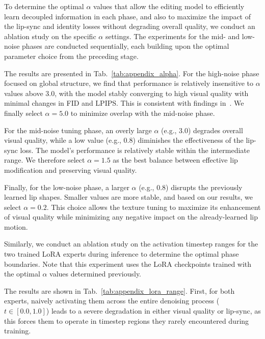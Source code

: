 To determine the optimal $\alpha$ values that allow the editing model to efficiently learn decoupled information in each phase, and also to maximize the impact of the lip-sync and identity losses without degrading overall quality, we conduct an ablation study on the specific $\alpha$ settings. The experiments for the mid- and low-noise phases are conducted sequentially, each building upon the optimal parameter choice from the preceding stage.



The results are presented in Tab.~\ref{tab:appendix_alpha}. For the high-noise phase focused on global structure, we find that performance is relatively insensitive to $\alpha$ values above 3.0, with the model stably converging to high visual quality with minimal changes in FID and LPIPS. This is consistent with findings in~\cite{esser2024sd3}. We finally select $\alpha=5.0$ to minimize overlap with the mid-noise phase.

For the mid-noise tuning phase, an overly large $\alpha$ (e.g., 3.0) degrades overall visual quality, while a low value (e.g., 0.8) diminishes the effectiveness of the lip-sync loss. The model's performance is relatively stable within the intermediate range. We therefore select $\alpha=1.5$ as the best balance between effective lip modification and preserving visual quality.

Finally, for the low-noise phase, a larger $\alpha$ (e.g., 0.8) disrupts the previously learned lip shapes. Smaller values are more stable, and based on our results, we select $\alpha=0.2$. This choice allows the texture tuning to maximize its enhancement of visual quality while minimizing any negative impact on the already-learned lip motion.

Similarly, we conduct an ablation study on the activation timestep ranges for the two trained LoRA experts during inference to determine the optimal phase boundaries. Note that this experiment uses the LoRA checkpoints trained with the optimal $\alpha$ values determined previously.

The results are shown in Tab.~\ref{tab:appendix_lora_range}. First, for both experts, naively activating them across the entire denoising process ($t\in[0.0, 1.0]$) leads to a severe degradation in either visual quality or lip-sync, as this forces them to operate in timestep regions they rarely encountered during training.

